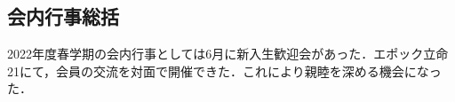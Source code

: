 \subsection*{会内行事総括}


2022年度春学期の会内行事としては6月に新入生歓迎会があった．エポック立命21にて，会員の交流を対面で開催できた．これにより親睦を深める機会になった．
